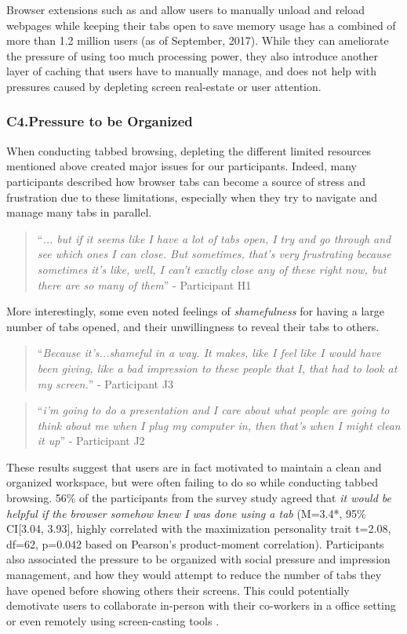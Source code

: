 Browser extensions such as \cite{suspend1} and \cite{suspend2} allow users to manually unload and reload webpages while keeping their tabs open to save memory usage has a combined of more than 1.2 million users (as of September, 2017). While they can ameliorate the pressure of using too much processing power, they also introduce another layer of caching that users have to manually manage, and does not help with pressures caused by depleting screen real-estate or user attention.

\subsubsection{C4.Pressure to be Organized}

When conducting tabbed browsing, depleting the different limited resources mentioned above created major issues for our participants. Indeed, many participants described how browser tabs can become a source of stress and frustration due to these limitations, especially when they try to navigate and manage many tabs in parallel.

\begin{quote}
``\emph{... but if it seems like I have a lot of tabs open, I try and go through and see which ones I can close. But sometimes, that's very frustrating because sometimes it's like, well, I can't exactly close any of these right now, but there are so many of them}'' - Participant H1
\end{quote}

More interestingly, some even noted feelings of \emph{shamefulness} for having a large number of tabs opened, and their unwillingness to reveal their tabs to others.

\begin{quote}
``\emph{Because it's...shameful in a way. It makes, like I feel like I would have been giving, like a bad impression to these people that I, that had to look at my screen.}'' - Participant J3

\end{quote}
\begin{quote}
``\emph{i'm going to do a presentation and I care about what people are going to think about me when I plug my computer in, then that's when I might clean it up}'' - Participant J2
\end{quote}

These results suggest that users are in fact motivated to maintain a clean and organized workspace, but were often failing to do so while conducting tabbed browsing. 56\% of the participants from the survey study agreed that \emph{it would be helpful if the browser somehow knew I was done using a tab} (M=3.4*, 95\% CI[3.04, 3.93], highly correlated with the maximization personality trait t=2.08, df=62, p=0.042 based on Pearson's product-moment correlation). Participants also associated the pressure to be organized with social pressure and impression management, and how they would attempt to reduce the number of tabs they have opened before showing others their screens. This could potentially demotivate users to collaborate in-person with their co-workers in a office setting or even remotely using screen-casting tools \cite{birnholtz2012distance}.


